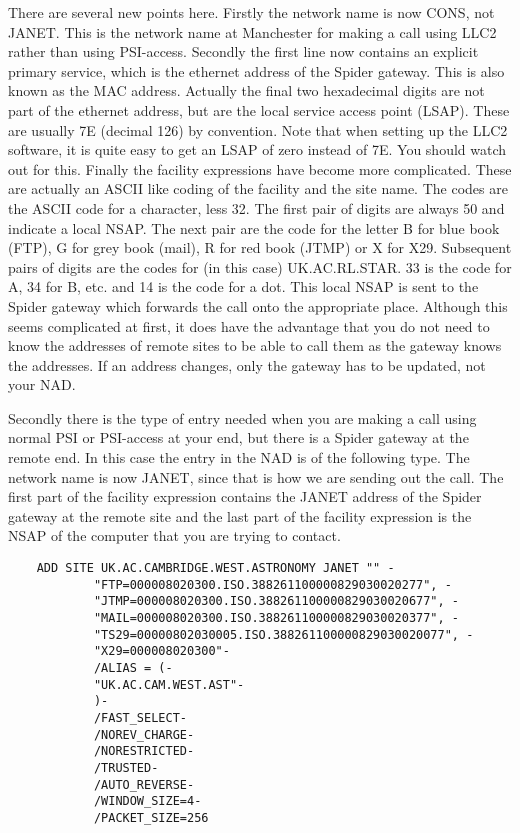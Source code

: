 There are several new points here. Firstly the network name is now CONS, not
JANET. This is the network name at Manchester for making a call using LLC2
rather than using PSI-access. Secondly the first line now contains an explicit
primary service, which is the ethernet address of the Spider gateway. This is
also known as the MAC address. Actually the final two hexadecimal digits are
not part of the ethernet address, but are the local service access point
(LSAP). These are usually 7E (decimal 126) by convention. Note that when
setting up the LLC2 software, it is quite easy to get an LSAP of zero instead
of 7E. You should watch out for this. Finally the facility expressions have
become more complicated. These are actually an ASCII like coding of the
facility and the site name. The codes are the ASCII code for a character, less
32. The first pair of digits are always 50 and indicate a local NSAP. The next
pair are the code for the letter B for blue book (FTP), G for grey book (mail),
R for red book (JTMP) or X for X29. Subsequent pairs of digits are the codes
for (in this case) UK.AC.RL.STAR. 33 is the code for A, 34 for B, etc. and 14
is the code for a dot. This local NSAP is sent to the Spider gateway which
forwards the call onto the appropriate place. Although this seems complicated
at first, it does have the advantage that you do not need to know the addresses
of remote sites to be able to call them as the gateway knows the addresses. If
an address changes, only the gateway has to be updated, not your NAD.

Secondly there is the type of entry needed when you are making a call using
normal PSI or PSI-access at your end, but there is a Spider gateway at the
remote end. In this case the entry in the NAD is of the following type. The
network name is now JANET, since that is how we are sending out the call.
The first part of the facility expression contains the JANET address of the
Spider gateway at the remote site and the last part of the facility expression
is the NSAP of the computer that you are trying to contact.

\begin{verbatim}
    ADD SITE UK.AC.CAMBRIDGE.WEST.ASTRONOMY JANET "" -
            "FTP=000008020300.ISO.388261100000829030020277", -
            "JTMP=000008020300.ISO.388261100000829030020677", -
            "MAIL=000008020300.ISO.388261100000829030020377", -
            "TS29=00000802030005.ISO.388261100000829030020077", -
            "X29=000008020300"-
            /ALIAS = (-
            "UK.AC.CAM.WEST.AST"-
            )-
            /FAST_SELECT-
            /NOREV_CHARGE-
            /NORESTRICTED-
            /TRUSTED-
            /AUTO_REVERSE-
            /WINDOW_SIZE=4-
            /PACKET_SIZE=256
\end{verbatim}

